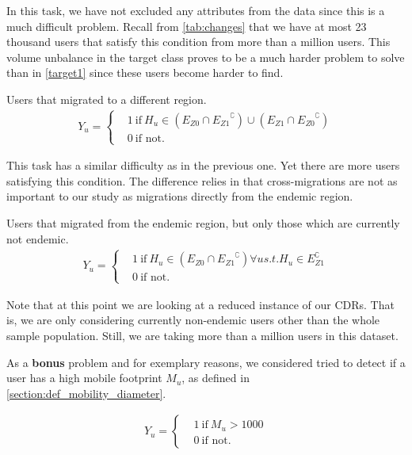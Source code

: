 In this task, we have not excluded any attributes from the data since this is a much difficult problem.
Recall from \cref{tab:changes} that we have at most 23 thousand users that satisfy this condition from more than a million users. This volume unbalance in the target class proves to be a much harder problem to solve than in \cref{target1} since these users become harder to find.



\begin{problem}\label{target3}
Users that migrated to a different region.
\begin{align*}
			Y_u =
			\begin{cases}
				&1 \ \mbox{if} \ H_u \in (E_{Z0} \cap { E_{Z1} }^{\complement}) \cup (E_{Z1} \cap { E_{Z0} }^{\complement}) \\
				&0 \ \mbox{if not}.
			\end{cases}
		\end{align*}
\end{problem}

This task has a similar difficulty as in the previous one. Yet there are more users satisfying this condition.
The difference relies in that cross-migrations are not as important to our study as migrations directly from the endemic region.

\begin{problem}\label{target4}
Users that migrated from the endemic region, but only those which are currently not endemic.
\begin{align*}
			Y_u =
			\begin{cases}
				&1 \ \mbox{if} \ H_u \in (E_{Z0} \cap { E_{Z1} }^{\complement}) \forall u s.t. H_u \in E_{Z1}^{\complement}    \\
				&0 \ \mbox{if not}.
			\end{cases}
		\end{align*}
\end{problem}

Note that at this point we are looking at a reduced instance of our CDRs. That is, we are only considering currently non-endemic users other than the whole sample population. Still, we are taking more than a million users in this dataset.


\begin{problem}\label{target5}
As a \textbf{bonus} problem and for exemplary reasons, we considered tried to detect if a user has a high mobile footprint $M_u$, as defined in \cref{section:def_mobility_diameter}.

	\begin{align*}
		Y_u =
		\begin{cases}
			&1 \ \mbox{if} \ {M_u >  1000 } \\
			&0 \ \mbox{if not}.
		\end{cases}
	\end{align*}

\end{problem}


